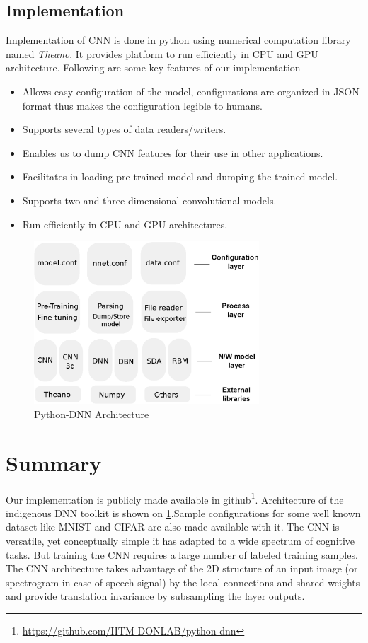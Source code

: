 \subsection{Implementation}
Implementation of CNN is done in python using numerical computation library named \textit{Theano}. It provides platform to run efficiently in CPU and GPU architecture. Following are some key features of our implementation
\begin{itemize}
	\item  Allows easy configuration of the model, configurations are organized in JSON format thus makes the configuration legible to humans.
	\item Supports several types of data readers/writers.
	\item Enables us to dump CNN features for their use in other applications.
	\item Facilitates in loading pre-trained model and dumping the trained model.
	\item Supports two and three dimensional convolutional models.
	\item Run efficiently in CPU and GPU architectures.	
\end{itemize}
\begin{figure}[htpb]
   \begin{center}
	    \includegraphics[width=0.75\textwidth]{snaps/architecture.eps}     
     \caption {Python-DNN Architecture}
	 \label{fig:architecture}
   \end{center}
 \end{figure}
\section{Summary}
Our implementation is publicly made available in github\footnote{\url{https://github.com/IITM-DONLAB/python-dnn}}. Architecture of the indigenous DNN toolkit is shown on \ref{fig:architecture}.Sample configurations for some well known dataset like MNIST and CIFAR are also made available with it.
The CNN is versatile, yet conceptually simple it has adapted to a wide spectrum of cognitive tasks. But training the CNN  requires a large number of labeled training samples. The CNN architecture takes advantage of the 2D structure of an input image (or spectrogram in case of speech signal) by the local connections and shared weights and provide translation invariance by subsampling the layer outputs.
